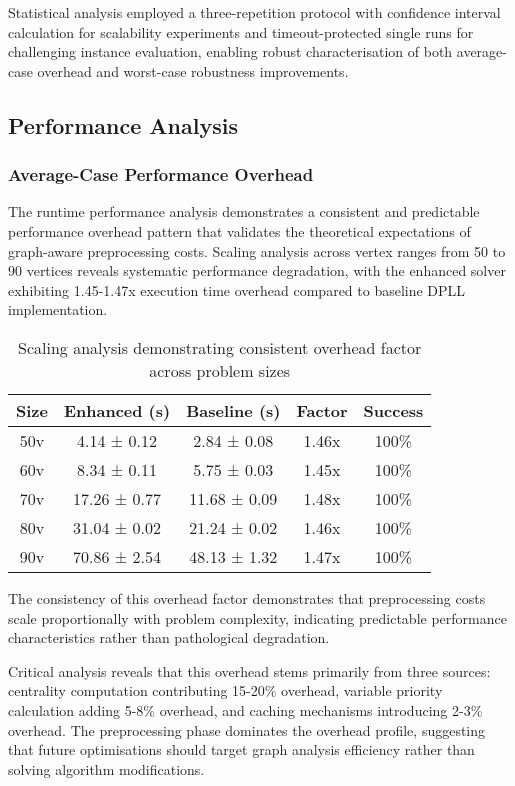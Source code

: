 Statistical analysis employed a three-repetition protocol with confidence interval calculation for scalability experiments and timeout-protected single runs for challenging instance evaluation, enabling robust characterisation of both average-case overhead and worst-case robustness improvements.

\subsection{Performance Analysis}

\subsubsection{Average-Case Performance Overhead}

The runtime performance analysis demonstrates a consistent and predictable performance overhead pattern that validates the theoretical expectations of graph-aware preprocessing costs. Scaling analysis across vertex ranges from 50 to 90 vertices reveals systematic performance degradation, with the enhanced solver exhibiting 1.45-1.47x execution time overhead compared to baseline DPLL implementation.

\begin{table}[h]
\centering
\small
\begin{tabular}{|c|c|c|c|c|}
\hline
\textbf{Size} & \textbf{Enhanced (s)} & \textbf{Baseline (s)} & \textbf{Factor} & \textbf{Success} \\
\hline
50v & 4.14 ± 0.12 & 2.84 ± 0.08 & 1.46x & 100\% \\
60v & 8.34 ± 0.11 & 5.75 ± 0.03 & 1.45x & 100\% \\
70v & 17.26 ± 0.77 & 11.68 ± 0.09 & 1.48x & 100\% \\
80v & 31.04 ± 0.02 & 21.24 ± 0.02 & 1.46x & 100\% \\
90v & 70.86 ± 2.54 & 48.13 ± 1.32 & 1.47x & 100\% \\
\hline
\end{tabular}
\caption{Scaling analysis demonstrating consistent overhead factor across problem sizes}
\label{tab:scaling_performance}
\end{table}

The consistency of this overhead factor demonstrates that preprocessing costs scale proportionally with problem complexity, indicating predictable performance characteristics rather than pathological degradation.

Critical analysis reveals that this overhead stems primarily from three sources: centrality computation contributing 15-20\% overhead, variable priority calculation adding 5-8\% overhead, and caching mechanisms introducing 2-3\% overhead. The preprocessing phase dominates the overhead profile, suggesting that future optimisations should target graph analysis efficiency rather than solving algorithm modifications.

